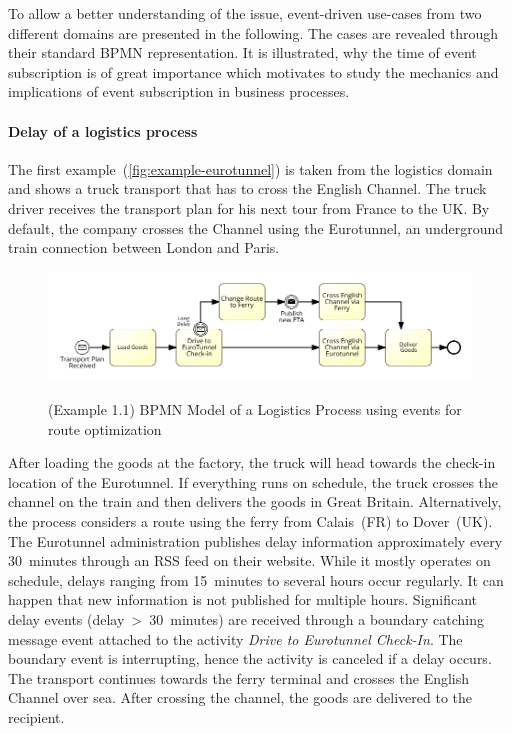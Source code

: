 To allow a better understanding of the issue, event-driven use-cases from two different domains are presented in the following.
The cases are revealed through their standard BPMN representation.
It is illustrated, why the time of event subscription is of great importance which motivates to study the mechanics and implications of event subscription in business processes.

\paragraph{Delay of a logistics process}
The first example~(\autoref{fig:example-eurotunnel}) is taken from the logistics domain and shows a truck transport that has to cross the English Channel.
The truck driver receives the transport plan for his next tour from France to the UK. By default, the company crosses the Channel using the Eurotunnel, an underground train connection between London and Paris.

\begin{figure}[]
	\myfloatalign
	{\includegraphics[width=1\linewidth]{chapters/requirements/Eurotunnel-simplified.png}}
	\caption{(Example 1.1) BPMN Model of a Logistics Process using events for route optimization}
	\label{fig:example-eurotunnel}
\end{figure}

After loading the goods at the factory, the truck will head towards the check-in location of the Eurotunnel.
If everything runs on schedule, the truck crosses the channel on the train and then delivers the goods in Great Britain.
Alternatively, the process considers a route using the ferry from Calais~(FR) to Dover~(UK).
The Eurotunnel administration publishes delay information approximately every 30~minutes through an RSS feed on their website. While it mostly operates on schedule, delays ranging from 15~minutes to several hours occur regularly. It can happen that new information is not published for multiple hours.
Significant delay events (delay~>~30~minutes) are received through a boundary catching message event attached to the activity \textit{Drive to Eurotunnel Check-In}. The boundary event is interrupting, hence the activity is canceled if a delay occurs.
The transport continues towards the ferry terminal and crosses the English Channel over sea. After crossing the channel, the goods are delivered to the recipient.

